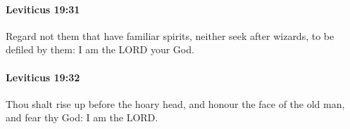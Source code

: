 		\paragraph{Leviticus 19:31} %
			\label{LEVITICUS-19-31}

			Regard not them that have familiar spirits, neither seek after wizards, to be defiled by them: I am the LORD your God.


		\paragraph{Leviticus 19:32} %
			\label{LEVITICUS-19-32}

			Thou shalt rise up before the hoary head, and honour the face of the old man, and fear thy God: I am the LORD.


